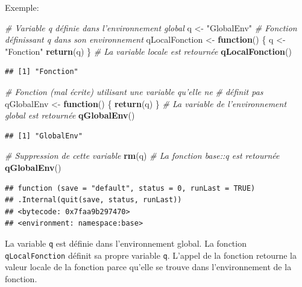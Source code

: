 \documentclass[
  12pt,
  french,
  a4paper,
  extrafontsizes,onecolumn,openright
  ]{memoir}
\newenvironment{Shaded}{\begin{snugshade}}{\end{snugshade}}
\newcommand{\CommentTok}[1]{\textcolor[rgb]{0.56,0.35,0.01}{\textit{#1}}}
\newcommand{\ControlFlowTok}[1]{\textcolor[rgb]{0.13,0.29,0.53}{\textbf{#1}}}
\newcommand{\KeywordTok}[1]{\textcolor[rgb]{0.13,0.29,0.53}{\textbf{#1}}}
\newcommand{\NormalTok}[1]{#1}
\newcommand{\StringTok}[1]{\textcolor[rgb]{0.31,0.60,0.02}{#1}}
\begin{document}
Exemple:

\scriptsize

\begin{Shaded}
\begin{Highlighting}[]
\CommentTok{# Variable q définie dans l'environnement global}
\NormalTok{q <-}\StringTok{ "GlobalEnv"}
\CommentTok{# Fonction définissant q dans son environnement}
\NormalTok{qLocalFonction <-}\StringTok{ }\ControlFlowTok{function}\NormalTok{() \{}
\NormalTok{    q <-}\StringTok{ "Fonction"}
    \KeywordTok{return}\NormalTok{(q)}
\NormalTok{\}}
\CommentTok{# La variable locale est retournée}
\KeywordTok{qLocalFonction}\NormalTok{()}
\end{Highlighting}
\end{Shaded}

\begin{verbatim}
## [1] "Fonction"
\end{verbatim}

\begin{Shaded}
\begin{Highlighting}[]
\CommentTok{# Fonction (mal écrite) utilisant une variable qu'elle ne}
\CommentTok{# définit pas}
\NormalTok{qGlobalEnv <-}\StringTok{ }\ControlFlowTok{function}\NormalTok{() \{}
    \KeywordTok{return}\NormalTok{(q)}
\NormalTok{\}}
\CommentTok{# La variable de l'environnement global est retournée}
\KeywordTok{qGlobalEnv}\NormalTok{()}
\end{Highlighting}
\end{Shaded}

\begin{verbatim}
## [1] "GlobalEnv"
\end{verbatim}

\begin{Shaded}
\begin{Highlighting}[]
\CommentTok{# Suppression de cette variable}
\KeywordTok{rm}\NormalTok{(q)}
\CommentTok{# La fonction base::q est retournée}
\KeywordTok{qGlobalEnv}\NormalTok{()}
\end{Highlighting}
\end{Shaded}

\begin{verbatim}
## function (save = "default", status = 0, runLast = TRUE) 
## .Internal(quit(save, status, runLast))
## <bytecode: 0x7faa9b297470>
## <environment: namespace:base>
\end{verbatim}

\normalsize

La variable \texttt{q} est définie dans l'environnement global.
La fonction \texttt{qLocalFonction} définit sa propre variable \texttt{q}.
L'appel de la fonction retourne la valeur locale de la fonction parce qu'elle se trouve dans l'environnement de la fonction.
\end{document}
